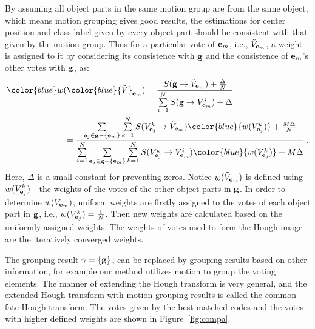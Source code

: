 \documentclass{mva2011}
\begin{document}
 By assuming all object parts in the same motion group are from the same object, which means motion grouping gives good results, the estimations for center position and class label given by every object part should be consistent with that given by the motion group.
Thus for a particular vote of ${\bf{e}}_m$, i.e., ${\tilde{V}}_{{\bf{e}}_m}$, a weight is assigned to it by considering its consistence with $\bf{g}$ and the consistence of ${\bf{e}}_m$'s other votes  with $\bf{g}$, as:
\begin{equation}
\begin{aligned}
{\color{blue}w(}&{\color{blue}{\tilde{V}}_{{\bf{e}}_m})}
= \frac
{S({\bf{g}} \to {{\tilde{V}}_{{\bf{e}}_m}}) + \frac{\Delta } N}
{\sum\limits^N_{i=1}{ S({\bf{g}} \to {V^i_{{{\bf{e}}_m}}})} + \Delta }\\
&
\begin{aligned}
= \frac
{ \sum\limits_{{{\bf{e}}_j} \in {\bf{g}}- \{ {{\bf{e}}_m} \}} {
\sum\limits^N_{k=1} {S({{V^k_{{{\bf{e}}_j}}} \to {{\tilde{V}}_{{{\bf{e}}_m}}}})\color{blue}{w(V^k_{{\bf{e}}_j})}}
}  + \frac{M\Delta } N}
{\sum\limits^N_{i=1}{
\sum\limits_{{{\bf{e}}_j} \in {\bf{g}}- \{ {{\bf{e}}_m} \}} {
\sum\limits^N_{k=1} {S({{V^k_{{{\bf{e}}_j}}} \to {V^i_{{{\bf{e}}_m}}}})\color{blue}{w(V^k_{{\bf{e}}_j})}}
}
} + M\Delta }\:.
\end{aligned}
\end{aligned}
\label{eq4}
\end{equation}
Here, $\Delta$ is a small constant for preventing zeros. Notice $w({\tilde{V}}_{{\bf{e}}_m})$ is defined using $w(V^k_{{\bf{e}}_j})$ - the weights of the votes of the other object parts in ${\bf{g}}$. In order to determine $w({\tilde{V}}_{{\bf{e}}_m})$, uniform weights are firstly assigned to the votes of each object part in ${\bf{g}}$, i.e., $w(V^k_{{\bf{e}}_j})=\frac{1}{N}$. Then new weights are calculated based on the uniformly assigned weights. The weights of votes used to form the Hough image are the iteratively converged weights.

The grouping result $\gamma=\{\bf{g}\}$, can be replaced by grouping results based on other information, for example our method utilizes motion to group the voting elements. The manner of extending the Hough transform is very general, and the extended Hough transform with motion grouping results is called the common fate Hough transform. The votes given by the best matched codes and the votes with higher defined weights are shown in Figure~\ref{fig:compa}.
\end{document}
